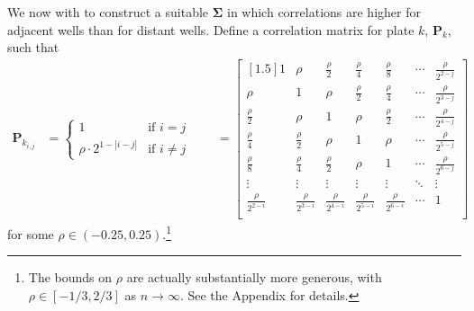 \documentclass[11pt, letterpaper]{article}
\begin{document}
We now with to construct a suitable $\bm  \Sigma$ in which correlations are higher for adjacent wells than for distant wells. Define a correlation matrix for plate $k$, $\bm P_k$, such that 
\begin{align*}
\bm P_{k_{i,j}} & = \begin{cases}
1 & \text{if } i = j \\
\rho \cdot 2 ^{1-|i-j|} & \text{if } i \neq j 
\end{cases} \qquad
= \begin{bmatrix}[1.5]
1 & \rho& \frac{\rho}{2} & \frac{\rho}{4} & \frac{\rho}{8} & \cdots & \frac{\rho}{2^{2-j}} \\
\rho & 1 & \rho & \frac{\rho}{2} & \frac{\rho}{4} & \cdots & \frac{\rho}{2^{3-j}} \\
\frac{\rho}{2} & \rho & 1 & \rho& \frac{\rho}{2} &  \cdots & \frac{\rho}{2^{4-j}} \\
\frac{\rho}{4} & \frac{\rho}{2} & \rho & 1   & \rho &  \cdots & \frac{\rho}{2^{5-j}} \\
\frac{\rho}{8} & \frac{\rho}{4} & \frac{\rho}{2} & \rho & 1  &  \cdots & \frac{\rho}{2^{6-j}} \\
\vdots & \vdots & \vdots & \vdots & \vdots &\ddots & \vdots \\
\frac{\rho}{2^{2-i}} & \frac{\rho}{2^{3-i}} & \frac{\rho}{2^{4-i}} & \frac{\rho}{2^{5-i}} & \frac{\rho}{2^{6-i}} & \cdots & 1 \\
\end{bmatrix}
\end{align*}
for some $\rho \in (-0.25,0.25)$.\footnote{The bounds on $\rho$ are actually substantially more generous, with $\rho \in [-1/3,2/3]$ as $n \to \infty$. See the Appendix for details.}
\end{document}
